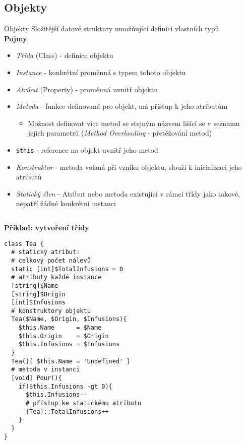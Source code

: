 \documentclass[main.tex]{subfiles}
\begin{document}
\subsection{Objekty}%
\begin{frame}{Objekty}
Složitější datové struktury umožňující definici vlastních typů.\\

  \textbf{Pojmy}
  \begin{itemize}
    \item \textit{Třída} (Class) - definice objektu
    \item \textit{Instance} - konkrétní proměnná s typem tohoto objektu
    \item \textit{Atribut} (Property) - proměnná uvnitř objektu
    \item \textit{Metoda} - funkce definovaná pro objekt, má přístup k jeho atributům
      \begin{itemize}
        \item Možnost definovat více metod se stejným názvem lišící se v seznamu jejich parametrů (\textit{Method Overloading} - přetěžování metod)
      \end{itemize}
    \item \texttt{\$this} - reference na objekt uvnitř jeho metod
    \item \textit{Konstruktor} - metoda volaná při vzniku objektu, slouží k inicializaci jeho atributů
    \item \textit{Statický člen} - Atribut nebo metoda existující v rámci třídy jako takové, nepatří žádné konkrétní instanci
  \end{itemize}
\framebreak
\begin{columns}[t]
  \begin{column}{0.35\textwidth}
\textbf{Příklad: vytvoření třídy}
    \begin{verbatim}
class Tea {
  # statický atribut:
  # celkový počet nálevů
  static [int]$TotalInfusions = 0
  # atributy každé instance
  [string]$Name
  [string]$Origin
  [int]$Infusions
  # konstruktory objektu
  Tea($Name, $Origin, $Infusions){
    $this.Name      = $Name
    $this.Origin    = $Origin
    $this.Infusions = $Infusions
  }
  Tea(){ $this.Name = 'Undefined' }
  # metoda v instanci
  [void] Pour(){
    if($this.Infusions -gt 0){
      $this.Infusions--
      # přístup ke statickému atributu
      [Tea]::TotalInfusions++
    }
  }
}
\end{verbatim}
\end{column}

\end{columns}
\end{frame}
\end{document}
